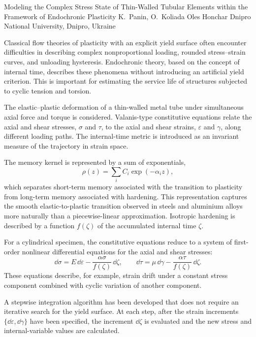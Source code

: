 \ReportHeading
  {Modeling the Complex Stress State of Thin-Walled Tubular Elements within the Framework of Endochronic Plasticity}
  {K.~Panin, O.~Koliada}
  {Oles Honchar Dnipro National University, Dnipro, Ukraine}
  {}

Classical flow theories of plasticity with an explicit yield surface often encounter difficulties in describing complex nonproportional loading, rounded stress--strain curves, and unloading hysteresis. Endochronic theory, based on the concept of internal time, describes these phenomena without introducing an artificial yield criterion. This is important for estimating the service life of structures subjected to cyclic tension and torsion.

The elastic--plastic deformation of a thin-walled metal tube under simultaneous axial force and torque is considered. Valanis-type constitutive equations relate the axial and shear stresses, $\sigma$ and $\tau$, to the axial and shear strains, $\varepsilon$ and $\gamma$, along different loading paths. The internal-time metric is introduced as an invariant measure of the trajectory in strain space.

The memory kernel is represented by a sum of exponentials,
\begin{equation}
 \rho(z)=\sum_i C_i\exp(-\alpha_i z),
\end{equation}
which separates short-term memory associated with the transition to plasticity from long-term memory associated with hardening. This representation captures the smooth elastic-to-plastic transition observed in steels and aluminium alloys more naturally than a piecewise-linear approximation. Isotropic hardening is described by a function $f(\zeta)$ of the accumulated internal time $\zeta$.

For a cylindrical specimen, the constitutive equations reduce to a system of first-order nonlinear differential equations for the axial and shear stresses:
\begin{equation}
 \dd\sigma=E\,\dd\varepsilon-\frac{\alpha\sigma}{f(\zeta)}\,\dd\zeta,
 \qquad
 \dd\tau=\mu\,\dd\gamma-\frac{\alpha\tau}{f(\zeta)}\,\dd\zeta.
\end{equation}
These equations describe, for example, strain drift under a constant stress component combined with cyclic variation of another component.

A stepwise integration algorithm has been developed that does not require an iterative search for the yield surface. At each step, after the strain increments $\{\dd\varepsilon,\dd\gamma\}$ have been specified, the increment $\dd\zeta$ is evaluated and the new stress and internal-variable values are calculated.

